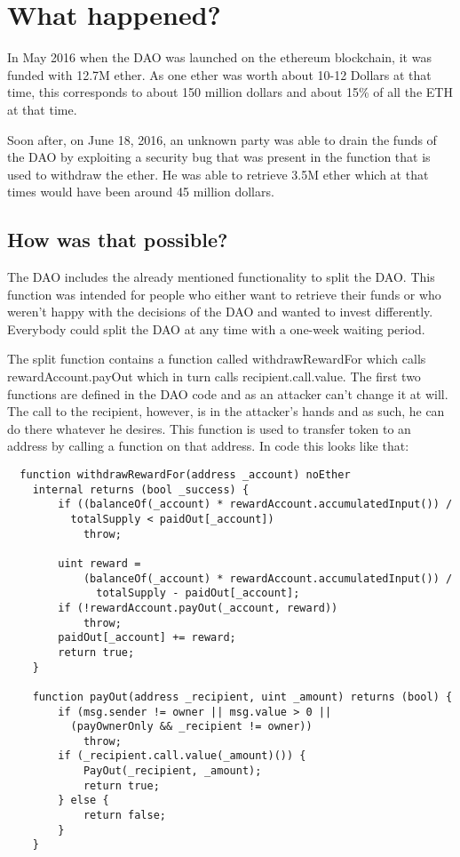 \documentclass[a4paper, 11pt]{scrartcl}
\begin{document}
\section{What happened?}

In May 2016 when the DAO was launched on the ethereum blockchain, it was funded with 12.7M ether.
As one ether was worth about 10-12 Dollars at that time, this corresponds to about 150 million dollars and about 15\% of all the ETH at that time.\cite{understandingDAO}

Soon after, on June 18, 2016, an unknown party was able to drain the funds of the DAO by exploiting a security bug that was present in the function that is used to withdraw the ether.
He was able to retrieve 3.5M ether which at that times would have been around 45 million dollars.

\subsection{How was that possible?}

The DAO includes the already mentioned functionality to split the DAO.
This function was intended for people who either want to retrieve their funds or who weren't happy with the decisions of the DAO and wanted to invest differently.
Everybody could split the DAO at any time with a one-week waiting period.

The split function contains a function called withdrawRewardFor which calls rewardAccount.payOut which in turn calls \textunderscore recipient.call.value. The first two functions are defined in the DAO code and as an attacker can't change it at will. The call to the recipient, however, is in the attacker's hands and as such, he can do there whatever he desires. This function is used to transfer token to an address by calling a function on that address. In code this looks like that: \cite{deconstructingDaoAttack}

\begin{verbatim}
  function withdrawRewardFor(address _account) noEther 
    internal returns (bool _success) {
        if ((balanceOf(_account) * rewardAccount.accumulatedInput()) /
          totalSupply < paidOut[_account])
            throw;

        uint reward =
            (balanceOf(_account) * rewardAccount.accumulatedInput()) /
              totalSupply - paidOut[_account];
        if (!rewardAccount.payOut(_account, reward))
            throw;
        paidOut[_account] += reward;
        return true;
    }

    function payOut(address _recipient, uint _amount) returns (bool) {
        if (msg.sender != owner || msg.value > 0 ||
          (payOwnerOnly && _recipient != owner))
            throw;
        if (_recipient.call.value(_amount)()) {
            PayOut(_recipient, _amount);
            return true;
        } else {
            return false;
        }
    }
\end{verbatim}
\end{document}
